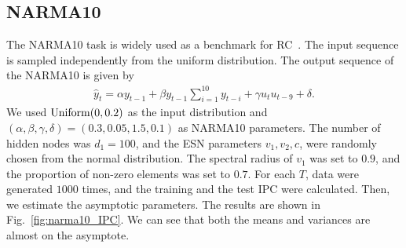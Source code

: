 \documentclass{article}
\begin{document}
 \subsection{NARMA10}
\begin{comment}
・RCのベンチマークとしてよく用いられるNARMA10を使う。
・複雑なタスクでも使えることを見る。
\end{comment}
The NARMA10 task is widely used as a benchmark for RC~\cite{atiya2000new}. 
The input sequence is sampled independently from the uniform distribution. 
The output sequence of the NARMA10 is given by 
\begin{align}
 \hat{y}_t 
  = \alpha y_{t-1} + \beta y_{t-1} \sum_{i=1}^{10} y_{t-i} + \gamma u_t u_{t-9} + \delta.
\end{align}
We used ${\rm Uniform}(0, 0.2)$ as the input distribution and $(\alpha, \beta, \gamma, \delta) = (0.3, 0.05, 1.5, 0.1)$ as NARMA10 parameters. 
The number of hidden nodes was $d_1 = 100$, and the ESN parameters $v_1, v_2, c$, were randomly chosen from the normal distribution. 
The spectral radius of $v_1$ was set to $0.9$, and the proportion of non-zero elements was set to $0.7$. 
For each $T$, data were generated $1000$ times, and the training and the test IPC were calculated. 
Then, we estimate the asymptotic parameters. 
The results are shown in Fig.~\ref{fig:narma10_IPC}. 
We can see that both the means and variances are almost on the asymptote. 

\begin{comment}
NARMA10 タスクは RC のベンチマークタスクとして広く使用されている\cite{atiya2000new}。
入力列は ${\rm Uniform}(0, 0.2)$ から独立にサンプルした。
NARMA10 の出力 $\hat{y}_t$ は以下で与えられる。
\begin{align}
\hat{y}_t = \alpha y_{t-1} + \beta y_{t-1} \sum_{i=1}^{10} y_{t-i} + \gamma u_t u_{t-9} + \delta,
\end{align}
ここで NARMA10 パラメーターとして $(\alpha, \beta, \gamma, \delta) = (0.3, 0.05, 1.5, 0.1)$ を使用した。
各 $T$ で $1000$ 回データを生成し、訓練 IPC とテスト IPC の計算を行った。
続いてそれらの平均値と分散から最小二乗法で漸近形のパラメータ推定をした。
結果は図\ref{fig:narma10_IPC}のようになった。
平均値、分散ともに漸近線にほぼ乗っていることが分かる。
\end{comment}
\end{document}
